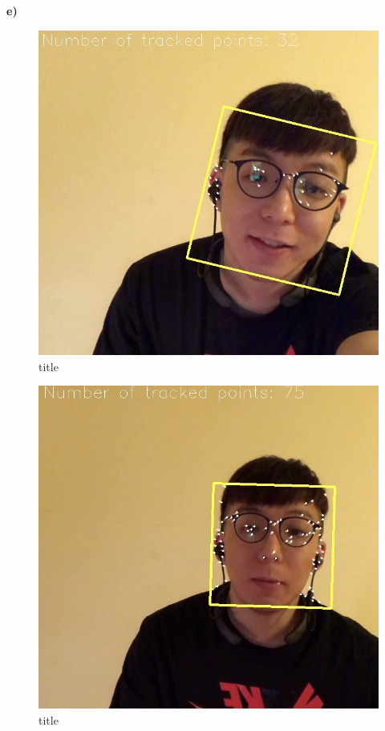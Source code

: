 \documentclass{article}
\begin{document}
\textbf{e)} 
\begin{figure}[H]
\centering  
\includegraphics[scale=0.3]{1.png}
\caption{title}
\label{fig: label}
\end{figure}

\begin{figure}[H]
\centering  
\includegraphics[scale=0.3]{2.png}
\caption{title}
\label{fig: label}
\end{figure}
\end{document}

